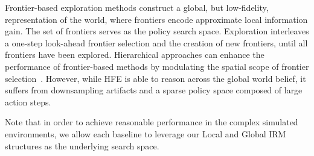 \documentclass[letterpaper]{article} %
\begin{document}
\begin{enumerate}[label={\arabic*)}]
	Frontier-based exploration methods construct a global, but low-fidelity, representation of the world, where frontiers encode approximate local information gain. The set of frontiers serves as the policy search space. Exploration interleaves a one-step look-ahead frontier selection and the creation of new frontiers, until all frontiers have been explored. Hierarchical approaches can enhance the performance of frontier-based methods by modulating the spatial scope of frontier selection~\cite{umari2017autonomous}. However, while HFE is able to reason across the global world belief, it suffers from downsampling artifacts and a sparse policy space composed of large action steps.
\end{enumerate}
\vspace{-3pt}
Note that in order to achieve reasonable performance in the complex simulated environments, we allow each baseline to leverage our Local and Global IRM structures as the underlying search space.
\end{document}
